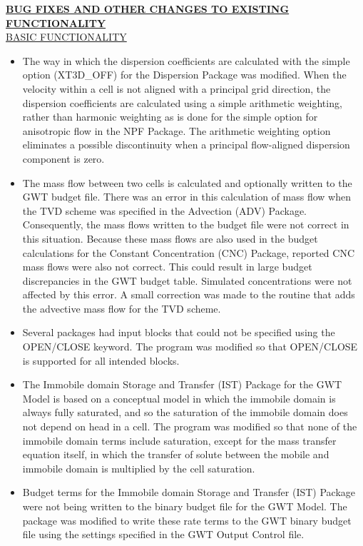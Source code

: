 \documentclass[11pt,twoside,twocolumn]{usgsreport}
\begin{document}
\begin{itemize}
	\textbf{\underline{BUG FIXES AND OTHER CHANGES TO EXISTING FUNCTIONALITY}} \\
	\underline{BASIC FUNCTIONALITY}
	\begin{itemize}
	        \item The way in which the dispersion coefficients are calculated with the simple option (XT3D\_OFF) for the Dispersion Package was modified.  When the velocity within a cell is not aligned with a principal grid direction, the  dispersion coefficients are calculated using a simple arithmetic weighting, rather than harmonic weighting as is done for the simple option for anisotropic flow in the NPF Package.  The arithmetic weighting option eliminates a possible discontinuity when a principal flow-aligned dispersion component is zero.
	        \item The mass flow between two cells is calculated and optionally written to the GWT budget file.  There was an error in this calculation of mass flow when the TVD scheme was specified in the Advection (ADV) Package.  Consequently, the mass flows written to the budget file were not correct in this situation.  Because these mass flows are also used in the budget calculations for the Constant Concentration (CNC) Package, reported CNC mass flows were also not correct.  This could result in large budget discrepancies in the GWT budget table.  Simulated concentrations were not affected by this error.  A small correction was made to the routine that adds the advective mass flow for the TVD scheme.
	        \item Several packages had input blocks that could not be specified using the OPEN/CLOSE keyword.  The program was modified so that OPEN/CLOSE is supported for all intended blocks.
	        \item The Immobile domain Storage and Transfer (IST) Package for the GWT Model is based on a conceptual model in which the immobile domain is always fully saturated, and so the saturation of the immobile domain does not depend on head in a cell.  The program was modified so that none of the immobile domain terms include saturation, except for the mass transfer equation itself, in which the transfer of solute between the mobile and immobile domain is multiplied by the cell saturation.
	        \item Budget terms for the Immobile domain Storage and Transfer (IST) Package were not being written to the binary budget file for the GWT Model.  The package was modified to write these rate terms to the GWT binary budget file using the settings specified in the GWT Output Control file.

\end{itemize}
\end{itemize}
\end{document}
